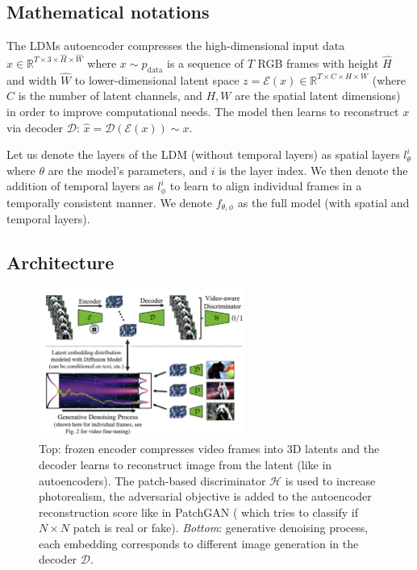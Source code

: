 \subsection*{Mathematical notations}

The LDMs autoencoder compresses the high-dimensional input data $x \in \mathbb{R}^{T \times 3 \times \hat{H} \times \hat{W}}$ where $x \sim p_{\text{data}}$ is a sequence of $T$ RGB frames with height $\hat{H}$ and width $\hat{W}$ to lower-dimensional latent space $z = \mathcal{E} (x) \in \mathbb{R}^{T \times C \times H \times W}$ (where $C$ is the number of latent channels, and $H, W$ are the spatial latent dimensions) in order to improve computational needs. The model then learns to reconstruct $x$ via decoder $\mathcal{D}$: $\hat{x} = \mathcal{D} (\mathcal{E} (x)) \sim x$.

Let us denote the layers of the LDM (without temporal layers) as spatial layers $l^i_{\theta}$ where $\theta$ are the model's parameters, and $i$ is the layer index. We then denote the addition of temporal layers as $l^i_{\phi}$ to learn to align individual frames in a temporally consistent manner. We denote $f_{\theta, \phi}$ as the full model (with spatial and temporal layers).






\subsection{Architecture}

\begin{figure}
    \centering
    \includegraphics[width=0.6\textwidth]{images/video_ldm/enc_dec_denoise_process.png}
    \caption{Top: frozen encoder compresses video frames into 3D latents and the decoder learns to reconstruct image from the latent (like in autoencoders). The patch-based discriminator $\mathcal{H}$ is used to increase photorealism, the adversarial objective is added to the autoencoder reconstruction score like in PatchGAN (\cite{isola2017image} which tries to classify if $N \times N$ patch is real or fake). \textit{Bottom}: generative denoising process, each embedding corresponds to different image generation in the decoder $\mathcal{D}$.}
\end{figure}

